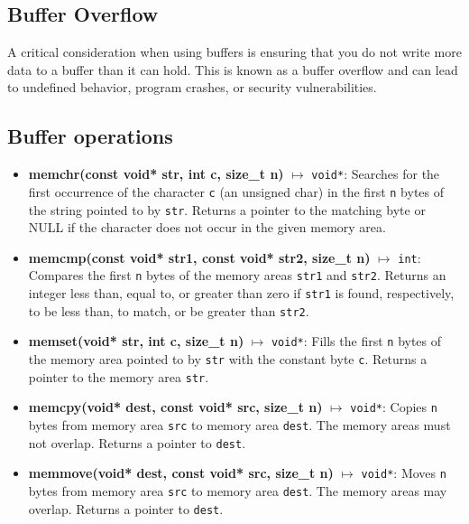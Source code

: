 \documentclass{report}
\begin{document}
\begin{concept}
    \bigbreak \noindent 
    \subsection{Buffer Overflow}
    \bigbreak \noindent 
    A critical consideration when using buffers is ensuring that you do not write more data to a buffer than it can hold. This is known as a buffer overflow and can lead to undefined behavior, program crashes, or security vulnerabilities.

    \bigbreak \noindent 
    \subsection{Buffer operations}
    \begin{itemize}
     \item \textbf{memchr(const void* str, int c, size\_t n)} $\mapsto$ \texttt{void*}: Searches for the first occurrence of the character \texttt{c} (an unsigned char) in the first \texttt{n} bytes of the string pointed to by \texttt{str}. Returns a pointer to the matching byte or NULL if the character does not occur in the given memory area.
        \item \textbf{memcmp(const void* str1, const void* str2, size\_t n)} $\mapsto$ \texttt{int}: Compares the first \texttt{n} bytes of the memory areas \texttt{str1} and \texttt{str2}. Returns an integer less than, equal to, or greater than zero if \texttt{str1} is found, respectively, to be less than, to match, or be greater than \texttt{str2}.
        \item \textbf{memset(void* str, int c, size\_t n)} $\mapsto$ \texttt{void*}: Fills the first \texttt{n} bytes of the memory area pointed to by \texttt{str} with the constant byte \texttt{c}. Returns a pointer to the memory area \texttt{str}.
        \item \textbf{memcpy(void* dest, const void* src, size\_t n)} $\mapsto$ \texttt{void*}: Copies \texttt{n} bytes from memory area \texttt{src} to memory area \texttt{dest}. The memory areas must not overlap. Returns a pointer to \texttt{dest}.
        \item \textbf{memmove(void* dest, const void* src, size\_t n)} $\mapsto$ \texttt{void*}: Moves \texttt{n} bytes from memory area \texttt{src} to memory area \texttt{dest}. The memory areas may overlap. Returns a pointer to \texttt{dest}.
    \end{itemize}

    \pagebreak 
    \bigbreak \noindent 

\end{concept}
\end{document}
